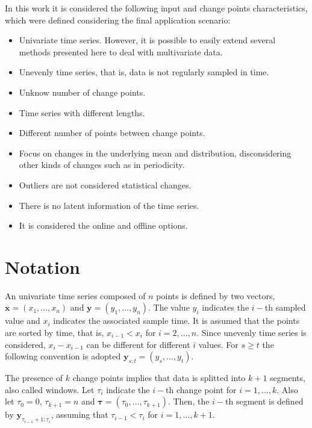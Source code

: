 In this work it is considered the following input and change points characteristics, which were defined considering the final application scenario:
\begin{itemize}
    \item Univariate time series. However, it is possible to easily extend several methods presented here to deal with multivariate data.
    \item Unevenly time series, that is, data is not regularly sampled in time.
    \item Unknow number of change points.
    \item Time series with different lengths.
    \item Different number of points between change points.
    \item Focus on changes in the underlying mean and distribution, disconsidering other kinds of changes such as in periodicity.
    \item Outliers are not considered statistical changes.
    \item There is no latent information of the time series.
    \item It is considered the online and offline options.
\end{itemize}

\section{Notation}

An univariate time series composed of $n$ points is defined by two vectors, $\mathbf{x} = (x_{1}, ..., x_{n})$ and $\mathbf{y} = (y_{1}, ..., y_{n})$. The value $y_{i}$ indicates the $i-$th sampled value and $x_{i}$ indicates the associated sample time. It is assumed that the points are sorted by time, that is, $x_{i - 1} < x_{i}$ for $i = 2, ..., n$. Since unevenly time series is considered, $x_{i} - x_{i - 1}$ can be different for different $i$ values. For $s \ge t$ the following convention is adopted $\mathbf{y}_{s:t} = (y_{s}, ..., y_{t})$.

The presence of $k$ change points implies that data is splitted into $k+1$ segments, also called windows. Let $\tau_{i}$ indicate the $i-$th change point for $i=1,...,k$. Also let $\tau_{0} = 0$, $\tau_{k + 1} = n$ and $\boldsymbol \tau = (\tau_{0}, ..., \tau_{k + 1})$. Then, the $i-$th segment is defined by $\mathbf{y}_{\tau_{i - 1} + 1 : \tau_{i}}$, assuming that $\tau_{i - 1} < \tau_{i}$ for $i = 1, ..., k + 1$.

